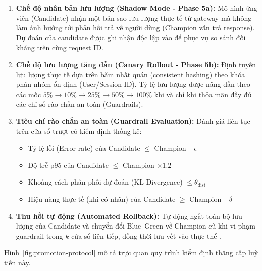 \begin{enumerate}
  \item \textbf{Chế độ nhân bản lưu lượng (Shadow Mode - Phase 5a):} Mô hình ứng viên (Candidate) nhận một bản sao lưu lượng thực tế từ gateway mà không làm ảnh hưởng tới phản hồi trả về người dùng (Champion vẫn trả response). Dự đoán của candidate được ghi nhận độc lập vào  để phục vụ so sánh đối kháng trên cùng request ID.
  \item \textbf{Chế độ lưu lượng tăng dần (Canary Rollout - Phase 5b):} Định tuyến lưu lượng thực tế dựa trên băm nhất quán (consistent hashing) theo khóa phân nhóm ổn định (User/Session ID). Tỷ lệ lưu lượng được nâng dần theo các mốc $5\% \rightarrow 10\% \rightarrow 25\% \rightarrow 50\% \rightarrow 100\%$ khi và chỉ khi thỏa mãn đầy đủ các chỉ số rào chắn an toàn (Guardrails).
  \item \textbf{Tiêu chí rào chắn an toàn (Guardrail Evaluation):} Đánh giá liên tục trên cửa sổ trượt có kiểm định thống kê:
  \begin{itemize}
    \item Tỷ lệ lỗi (Error rate) của Candidate $\le$ Champion $+ \epsilon$
    \item Độ trễ p95 của Candidate $\le$ Champion $\times 1.2$
    \item Khoảng cách phân phối dự đoán (KL-Divergence) $\le \theta_\text{dist}$
    \item Hiệu năng thực tế (khi có nhãn) của Candidate $\ge$ Champion $- \delta$
  \end{itemize}
  \item \textbf{Thu hồi tự động (Automated Rollback):} Tự động ngắt toàn bộ lưu lượng của Candidate và chuyển đổi Blue--Green về Champion cũ khi vi phạm guardrail trong $k$ cửa sổ liên tiếp, đồng thời lưu vết  vào thực thể .
\end{enumerate}

Hình~\ref{fig:promotion-protocol} mô tả trực quan quy trình kiểm định thăng cấp luỹ tiến này.

